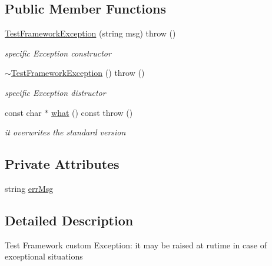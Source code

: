 \subsection*{Public Member Functions}
\begin{DoxyCompactItemize}
\item 
\hyperlink{classit_1_1testbench_1_1data_1_1TestFrameworkException_ad2d5f0390e5406a1aac0d82fdef8a22c}{Test\-Framework\-Exception} (string msg)  throw ()
\begin{DoxyCompactList}\small\item\em specific Exception constructor \end{DoxyCompactList}\item 
\hyperlink{classit_1_1testbench_1_1data_1_1TestFrameworkException_a11f9cc85041e962738e7946f15407ea0}{$\sim$\-Test\-Framework\-Exception} ()  throw ()
\begin{DoxyCompactList}\small\item\em specific Exception distructor \end{DoxyCompactList}\item 
const char $\ast$ \hyperlink{classit_1_1testbench_1_1data_1_1TestFrameworkException_a885aa2f8d9ad499138327ec9615f0f2b}{what} () const   throw ()
\begin{DoxyCompactList}\small\item\em it overwrites the standard version \end{DoxyCompactList}\end{DoxyCompactItemize}
\subsection*{Private Attributes}
\begin{DoxyCompactItemize}
\item 
string \hyperlink{classit_1_1testbench_1_1data_1_1TestFrameworkException_aa7d40a46be76ef920df2862a54bee6bb}{err\-Msg}
\end{DoxyCompactItemize}


\subsection{Detailed Description}
Test Framework custom Exception\-: it may be raised at rutime in case of exceptional situations 

